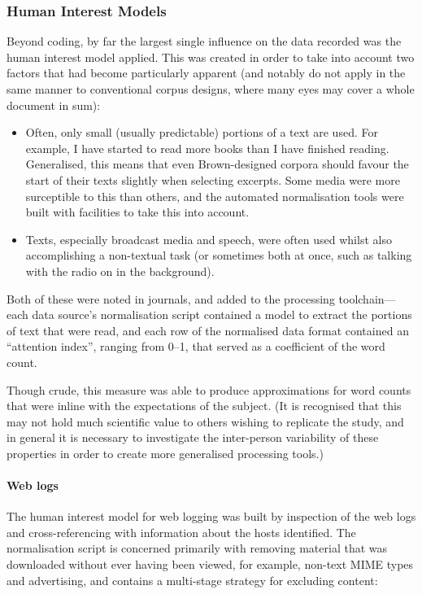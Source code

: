 \subsubsection{Human Interest Models}
Beyond coding, by far the largest single influence on the data recorded was the human interest model applied.  This was created in order to take into account two factors that had become particularly apparent (and notably do not apply in the same manner to conventional corpus designs, where many eyes may cover a whole document in sum):

\begin{itemize}
    \item Often, only small (usually predictable) portions of a text are used.  For example, I have started to read more books than I have finished reading.  Generalised, this means that even Brown-designed corpora should favour the start of their texts slightly when selecting excerpts.  Some media were more surceptible to this than others, and the automated normalisation tools were built with facilities to take this into account.
    \item Texts, especially broadcast media and speech, were often used whilst also accomplishing a non-textual task (or sometimes both at once, such as talking with the radio on in the background).
\end{itemize}

Both of these were noted in journals, and added to the processing toolchain---each data source's normalisation script contained a model to extract the portions of text that were read, and each row of the normalised data format contained an ``attention index'', ranging from 0--1, that served as a coefficient of the word count.

Though crude, this measure was able to produce approximations for word counts that were inline with the expectations of the subject.  (It is recognised that this may not hold much scientific value to others wishing to replicate the study, and in general it is necessary to investigate the inter-person variability of these properties in order to create more generalised processing tools.)


\paragraph{Web logs}
The human interest model for web logging was built by inspection of the web logs and cross-referencing with information about the hosts identified.  The normalisation script is concerned primarily with removing material that was downloaded without ever having been viewed, for example, non-text MIME types and advertising, and contains a multi-stage strategy for excluding content:

